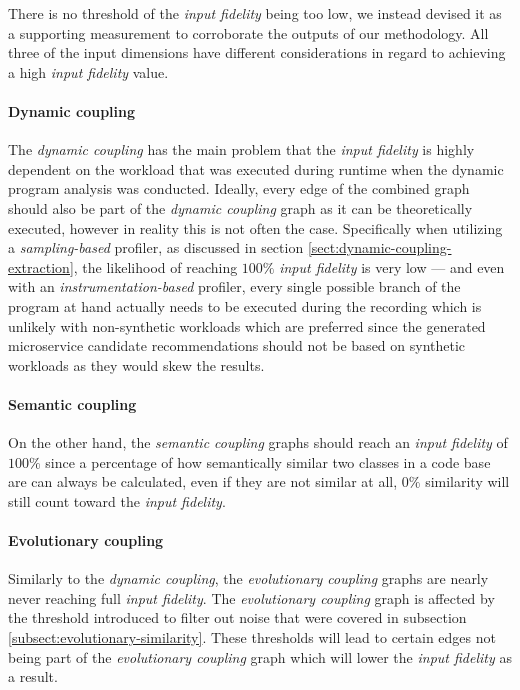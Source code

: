 \documentclass[12pt,a4paper]{report}
\begin{document}
There is no threshold of the \textit{input fidelity} being too low,
we instead devised it as a supporting measurement to corroborate the outputs
of our methodology. All three of the input dimensions have different
considerations in regard to achieving a high \textit{input fidelity} value.

\paragraph{Dynamic coupling}
The \textit{dynamic coupling} has the main problem that the \textit{input fidelity}
is highly dependent on the workload that was executed during runtime when the
dynamic program analysis was conducted. Ideally, every edge of the combined graph
should also be part of the \textit{dynamic coupling} graph as it can be
theoretically executed, however in reality this is not often the case.
Specifically when utilizing a \textit{sampling\hyp based} profiler,
as discussed in section \ref{sect:dynamic-coupling-extraction},
the likelihood of reaching \(100\%\) \textit{input fidelity} is very low ---
and even with an \textit{instrumentation\hyp based} profiler,
every single possible branch of the program at hand actually needs to be
executed during the recording which is unlikely with non\hyp synthetic workloads
which are preferred since the generated microservice candidate recommendations
should not be based on synthetic workloads as they would skew the results.

\paragraph{Semantic coupling}
On the other hand, the \textit{semantic coupling} graphs should reach an
\textit{input fidelity} of \(100\%\) since a percentage of how semantically
similar two classes in a code base are can always be calculated,
even if they are not similar at all, \(0\%\) similarity will still
count toward the \textit{input fidelity}.

\paragraph{Evolutionary coupling}
Similarly to the \textit{dynamic coupling}, the \textit{evolutionary coupling}
graphs are nearly never reaching full \textit{input fidelity}.
The \textit{evolutionary coupling} graph is affected by the threshold introduced
to filter out noise that were covered in subsection \ref{subsect:evolutionary-similarity}.
These thresholds will lead to certain edges not being part of the
\textit{evolutionary coupling} graph which will lower the \textit{input fidelity}
as a result.
\end{document}
